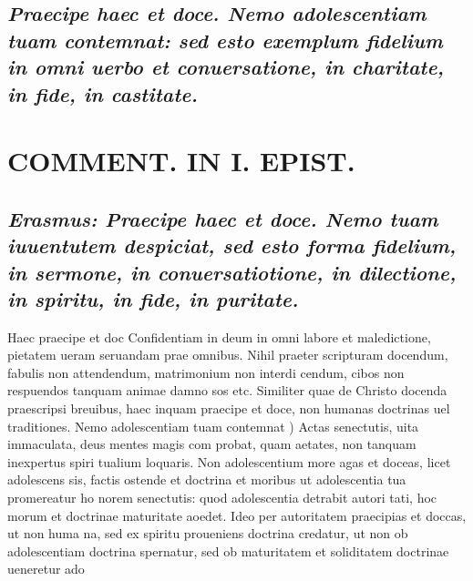 \documentclass{article}
\begin{document}
\begin{pages}
\subsection*{\textit{Praecipe haec et doce. Nemo adolescentiam tuam contemnat: sed esto exemplum fidelium in omni uerbo et conuersatione, in charitate, in fide, in castitate. }}
\section*{COMMENT. IN I. EPIST. }
\marginpar{[ p.108 ]}
{}
\subsection*{\textit{Erasmus: Praecipe haec et doce. Nemo tuam iuuentutem despiciat, sed esto forma fidelium, in sermone, in conuersatiotione, in dilectione, in spiritu, in fide, in puritate. }}\pstart Haec praecipe et doc Confidentiam in deum in omni labore et maledictione, pietatem ueram seruandam prae omnibus. Nihil praeter scripturam docendum, fabulis non attendendum, matrimonium non interdi cendum, cibos non respuendos tanquam animae damno sos etc. Similiter quae de Christo docenda praescripsi breuibus, haec inquam praecipe et doce, non humanas doctrinas uel traditiones.  \pend\pstart Nemo adolescentiam tuam contemnat ) Actas senectutis, uita immaculata, deus mentes magis com probat, quam aetates, non tanquam inexpertus spiri tualium loquaris. Non adolescentium more agas et doceas, licet adolescens sis, factis ostende et doctrina et moribus ut adolescentia tua promereatur ho norem senectutis: quod adolescentia detrabit autori tati, hoc morum et doctrinae maturitate aoedet. Ideo per autoritatem praecipias et doccas, ut non huma na, sed ex spiritu proueniens doctrina credatur, ut non ob adolescentiam doctrina spernatur, sed ob maturitatem et soliditatem doctrinae ueneretur ado  \pend

\end{pages}
\end{document}
